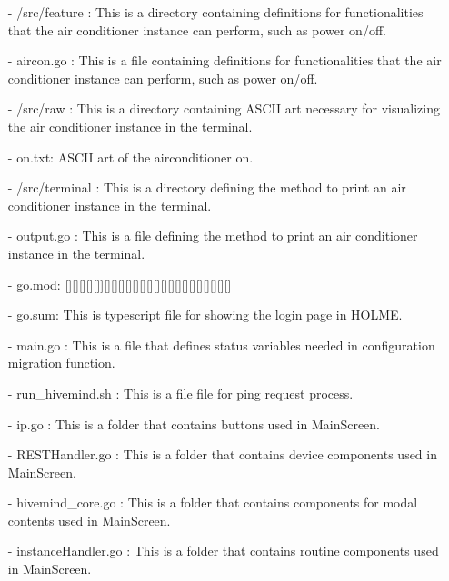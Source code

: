 \documentclass[conference]{IEEEtran}
\begin{document}
\begin{enumerate}
        \item[-] /src/feature : This is a directory containing definitions for functionalities that the air conditioner instance can perform, such as power on/off.\\
        \item[-] aircon.go : This is a file containing definitions for functionalities that the air conditioner instance can perform, such as power on/off.\\
        \item[-] /src/raw  : This is a directory containing ASCII art necessary for visualizing the air conditioner instance in the terminal.\\
        \item[-] on.txt: ASCII art of the airconditioner on. \\
        \item[-] /src/terminal : This is a directory defining the method to print an air conditioner instance in the terminal.\\
        \item[-]  output.go : This is a file defining the method to print an air conditioner instance in the terminal.\\
        \item[-] go.mod: [][][][][]][][][][][][][][][][][][][][][][][][] \\
        \item[-] go.sum: This is typescript file for showing the login page in HOLME.\\
        \item[-] main.go : This is a file that defines status variables needed in configuration migration function.\\
        \item[-] run\_hivemind.sh : This is a file file for ping request process.\\
        \item[-] ip.go : This is a folder that contains buttons used in MainScreen.\\
        \item[-] RESTHandler.go : This is a folder that contains device components used in MainScreen.\\
        \item[-] hivemind\_core.go : This is a folder that contains components for modal contents used in MainScreen.\\
        \item[-] instanceHandler.go : This is a folder that contains routine components used in MainScreen.\\

\end{enumerate}
\end{document}
